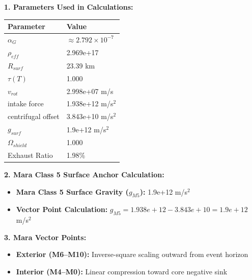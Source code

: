 \documentclass[11pt, a4paper]{article}
\begin{document}
\vspace{0.5em}
\noindent \textbf{1. Parameters Used in Calculations:}
\begin{center}
  \begin{tabular}{|l|l|}
    \hline
    \textbf{Parameter} & \textbf{Value} \\ \hline
    $\alpha_G$ & $\approx 2.792 \times 10^{-7}$ \\ \hline
    $\rho_{eff}$ & 2.969e+17 \\ \hline
    $R_{surf}$ & 23.39 km \\ \hline
    $\tau(T)$ & 1.000 \\ \hline
    $v_{rot}$ & 2.998e+07 m/s \\ \hline
    intake force & 1.938e+12 m/s$^2$ \\ \hline
    centrifugal offset & 3.843e+10 m/s$^2$ \\ \hline
    $g_{surf}$ & 1.9e+12 m/s$^2$ \\ \hline
    $\Omega_{shield}$ & 1.000 \\ \hline
    Exhaust Ratio & 1.98\% \\ \hline
  \end{tabular}
\end{center}

\vspace{0.5em}
\noindent \textbf{2. Mara Class 5 Surface Anchor Calculation:}
\begin{itemize}
  \item \textbf{Mara Class 5 Surface Gravity ($g_{M5}$):} 1.9e+12 m/s$^2$
  \item \textbf{Vector Point Calculation:} $g_{M5} = 1.938e+12 - 3.843e+10 = 1.9e+12$ m/s$^2$
\end{itemize}

\vspace{0.5em}
\noindent \textbf{3. Mara Vector Points:}
\begin{itemize}
  \item \textbf{Exterior (M6--M10):} Inverse-square scaling outward from event horizon
  \item \textbf{Interior (M4--M0):} Linear compression toward core negative sink
\end{itemize}
\end{document}
